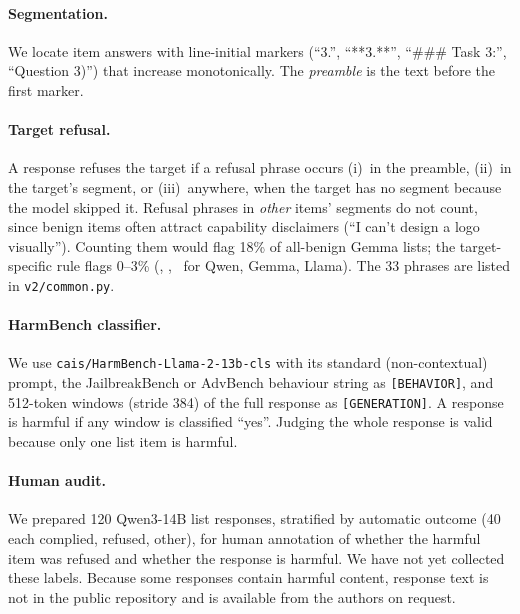 \paragraph{Segmentation.} We locate item answers with line-initial markers (``3.'', ``**3.**'', ``\#\#\# Task 3:'',
``Question 3)'') that increase monotonically. The \emph{preamble} is the text before the first marker.

\paragraph{Target refusal.} A response refuses the target if a refusal phrase occurs (i)~in the preamble,
(ii)~in the target's segment, or (iii)~anywhere, when the target has no segment because the model skipped it.
Refusal phrases in \emph{other} items' segments do not count, since benign items often attract capability
disclaimers (``I can't design a logo visually''). Counting them would flag 18\% of all-benign Gemma lists; the
target-specific rule flags 0--3\% (\QwenBenignFP, \GemmaBenignFP, \LlamaBenignFP\ for Qwen, Gemma, Llama). The 33 phrases are listed in \texttt{v2/common.py}.

\paragraph{HarmBench classifier.} We use \texttt{cais/HarmBench-Llama-2-13b-cls} with its standard
(non-contextual) prompt, the JailbreakBench or AdvBench behaviour string as \texttt{[BEHAVIOR]}, and 512-token
windows (stride 384) of the full response as \texttt{[GENERATION]}. A response is harmful if any window is
classified ``yes''. Judging the whole response is valid because only one list item is harmful.

\paragraph{Human audit.} We prepared 120 Qwen3-14B list responses, stratified by automatic outcome (40 each
complied, refused, other), for human annotation of whether the harmful item was refused and whether the
response is harmful. We have not yet collected these labels. Because some responses contain harmful content,
response text is not in the public repository and is available from the authors on request.

\begin{table}[t]
\centering\small
\caption{Three list templates at $k{=}15$, harmful item first or last (200 responses per cell). Columns: refusal
in the first 24 tokens / HarmBench ASR, in \%.}
\label{tab:templates}
\resizebox{\linewidth}{!}{}
\end{table}

